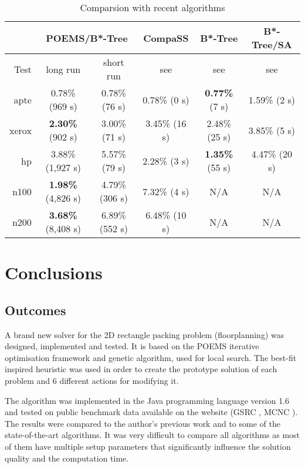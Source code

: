 \begin{table}
\centering
\begin{tabular}{|r|c|c|c|c|c|}
\hline
 & \multicolumn{2}{|c|}{POEMS/B*-Tree} & CompaSS & B*-Tree & B*-Tree/SA \\
\hline
Test & long run & short run & see \cite{bench} & see \cite{btree} & see \cite{btreesa} \\
\hline
\hline
apte & 0.78\% (969 s) & 0.78\% (76 s) & 0.78\% (0 s) & {\bf 0.77\%} (7 s) & 1.59\% (2 s) \\
\hline
xerox & {\bf 2.30\%} (902 s) & 3.00\% (71 s) & 3.45\% (16 s) & 2.48\% (25 s) & 3.85\% (5 s) \\
\hline
hp & 3.88\% (1,927 s) & 5.57\% (79 s) & 2.28\% (3 s) & {\bf 1.35\%} (55 s) & 4.47\% (20 s) \\
\hline
n100 & {\bf 1.98\%} (4,826 s) & 4.79\% (306 s) & 7.32\% (4 s) & N/A & N/A \\
\hline
n200 & {\bf 3.68\%} (8,408 s) & 6.89\% (552 s) & 6.48\% (10 s) & N/A & N/A \\
\hline
\end{tabular}
\caption{Comparsion with recent algorithms}
\label{tab:stateofart}
\end{table}

\clearpage
\section{Conclusions}
\label{sec:conclusions}

\subsection{Outcomes}

A brand new solver for the 2D rectangle packing problem (floorplanning) was designed, implemented and tested. It is based on the POEMS iterative optimisation framework and genetic algorithm, used for local search. The best-fit inspired heuristic was used in order to create the prototype solution of each problem and 6 different actions for modifying it. 

The algorithm was implemented in the Java programming language version 1.6 and tested on public benchmark data available on the website \cite{bench} (GSRC \cite{benchgsrc}, MCNC \cite{benchmcnc}). The results were compared to the author's previous work \cite{vh} and to some of the state-of-the-art algorithms. It was very difficult to compare all algorithms as most of them have multiple setup parameters that significantly influence the solution quality and the computation time.

